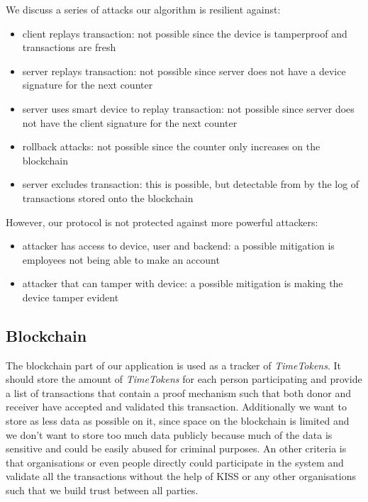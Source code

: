 \documentclass[12pt]{report}
\begin{document}
We discuss a series of attacks our algorithm is resilient against:
\begin{itemize}
    \item client replays transaction: not possible since the device is tamperproof and transactions are fresh
    \item server replays transaction: not possible since server does not have a device signature for the next counter
    \item server uses smart device to replay transaction: not possible since server does not have the client signature for the next counter
    \item rollback attacks: not possible since the counter only increases on the blockchain
    \item server excludes transaction: this is possible, but detectable from by the log of transactions stored onto the blockchain
\end{itemize}

However, our protocol is not protected against more powerful attackers:
\begin{itemize}
    \item attacker has access to device, user and backend: a possible mitigation is employees not being able to make an account
    \item attacker that can tamper with device: a possible mitigation is making the device tamper evident
\end{itemize}

\subsection{Blockchain}
The blockchain part of our application is used as a tracker of \emph{TimeTokens}. It should store the amount of \emph{TimeTokens} for each person participating and provide a list
of transactions that contain a proof mechanism such that both donor and receiver have accepted and validated this transaction.
Additionally we want to store as less data as possible on it, since space on the blockchain is limited and we don't want to store too much data publicly because much of the data is sensitive and could be easily abused for criminal purposes.
An other criteria is that organisations or even people directly could participate in the system and validate all the transactions without the help of KISS or any other organisations such that we build trust between all parties.
\end{document}
